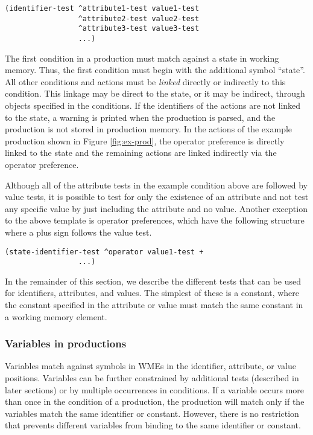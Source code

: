 \begin{verbatim}
(identifier-test ^attribute1-test value1-test
                 ^attribute2-test value2-test
                 ^attribute3-test value3-test
                 ...)
\end{verbatim}

The first condition in a production must match against a state in working memory.  Thus, the first condition must begin with the additional symbol ``state''.  All other conditions and actions must be \textit{linked} directly or indirectly to this condition. This linkage may be direct to the state, or it may be indirect, through objects specified in the conditions.  If the identifiers of the actions are not linked to the state, a warning is printed when the production is parsed, and the production is not stored in production memory.  In the actions of the example production shown in Figure \ref{fig:ex-prod}, the operator preference is directly linked to the state and the remaining actions are linked indirectly via the operator preference.

Although all of the attribute tests in the example condition above are followed by value tests, it is possible to test for only the existence of an attribute and not test any specific value by just including the attribute and no value.  Another exception to the above template is operator preferences, which have the following structure where a plus sign follows the value test.

\begin{verbatim}
(state-identifier-test ^operator value1-test +
                 ...)
\end{verbatim}

In the remainder of this section, we describe the different tests that can be used for identifiers, attributes, and values.  The simplest of these is a constant, where the constant specified in the attribute or value must match the same constant in a working memory element.

\subsubsection{Variables in productions}
\label{SYNTAX-pm-lhs-variables}

Variables match against symbols in WMEs in the identifier, attribute, or value positions.  Variables can be further constrained by additional tests (described in later sections) or by multiple occurrences in conditions.  If a variable occurs more than once in the condition of a production, the production will match only if the variables match the same identifier or constant.  However, there is no restriction that prevents different variables from binding to the same identifier or constant.

